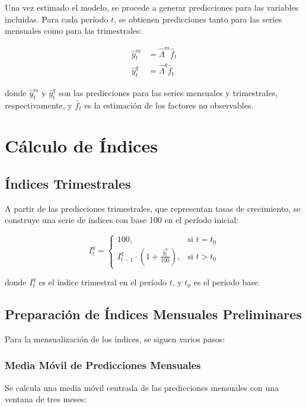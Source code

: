 \documentclass[12pt,a4paper]{article}
\begin{document}
Una vez estimado el modelo, se procede a generar predicciones para las variables incluidas. Para cada período $t$, se obtienen predicciones tanto para las series mensuales como para las trimestrales:

\begin{align}
\hat{y}_t^m &= \hat{\Lambda}^m \hat{f}_t \\
\hat{y}_t^q &= \hat{\Lambda}^q \hat{f}_t
\end{align}

donde $\hat{y}_t^m$ y $\hat{y}_t^q$ son las predicciones para las series mensuales y trimestrales, respectivamente, y $\hat{f}_t$ es la estimación de los factores no observables.

\section{Cálculo de Índices}

\subsection{Índices Trimestrales}

A partir de las predicciones trimestrales, que representan tasas de crecimiento, se construye una serie de índices con base 100 en el período inicial:

\begin{equation}
I_t^q = 
\begin{cases}
    100, & \text{si } t = t_0 \\
    I_{t-1}^q \cdot \left(1 + \frac{\hat{y}_t^q}{100}\right), & \text{si } t > t_0
\end{cases}
\end{equation}

donde $I_t^q$ es el índice trimestral en el período $t$, y $t_0$ es el período base.

\subsection{Preparación de Índices Mensuales Preliminares}

Para la mensualización de los índices, se siguen varios pasos:

\subsubsection{Media Móvil de Predicciones Mensuales}

Se calcula una media móvil centrada de las predicciones mensuales con una ventana de tres meses:
\end{document}
